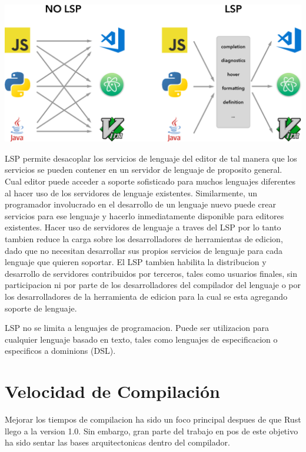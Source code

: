\documentclass[12pt, a4paper]{report}
\begin{document}
\includegraphics{lsp}

LSP permite desacoplar los servicios de lenguaje del editor de tal manera que los servicios se pueden contener en un servidor de lenguaje de proposito general.
Cual editor puede acceder a soporte sofisticado para muchos lenguajes diferentes al hacer uso de los servidores de lenguaje existentes.
Similarmente, un programador involucrado en el desarrollo de un lenguaje nuevo puede crear servicios para ese lenguaje y hacerlo inmediatamente disponible para editores existentes.
Hacer uso de servidores de lenguaje a traves del LSP por lo tanto tambien reduce la carga sobre los desarrolladores de herramientas de edicion, dado que no necesitan desarrollar sus propios servicios de lenguaje para cada lenguaje que quieren soportar.
El LSP tambien habilita la distribucion y desarrollo de servidores contribuidos por terceros, tales como usuarios finales, sin participacion ni por parte de los desarrolladores del compilador del lenguaje o por los desarrolladores de la herramienta de edicion para la cual se esta agregando soporte de lenguaje.
\cite{language_server_protocol_wiki}

LSP no se limita a lenguajes de programacion.
Puede ser utilizacion para cualquier lenguaje basado en texto, tales como lenguajes de especificacion o especificos a dominions (DSL).
\cite{language_server_protocol_wiki}

\section*{Velocidad de Compilación}

Mejorar los tiempos de compilacion ha sido un foco principal despues de que Rust llego a la version 1.0.
Sin embargo, gran parte del trabajo en pos de este objetivo ha sido sentar las bases arquitectonicas dentro del compilador.
\end{document}
